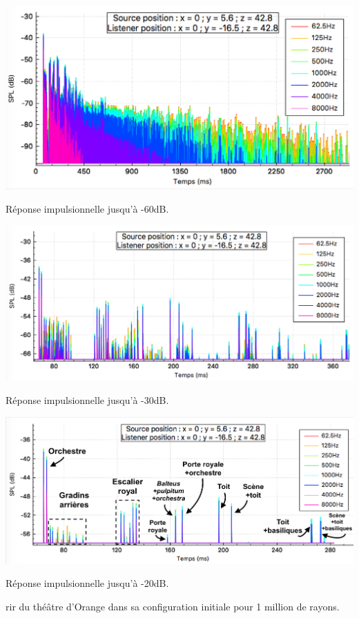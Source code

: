 \begin{figureth}
	\begin{subfigureth}{\linewidth}
		\includegraphics[width=\linewidth]{images/rirTheatreAvecDecor}
			\caption{Réponse impulsionnelle jusqu'à -60dB.}
		\label{rirTheatre60}
	\end{subfigureth}
	\begin{subfigureth}{\linewidth}
		\includegraphics[width=\linewidth]{images/rirTheatre30}
		\caption{Réponse impulsionnelle jusqu'à -30dB.}
		\label{rirTheatre30}
	\end{subfigureth}
		\begin{subfigureth}{\linewidth}
		\includegraphics[width=\linewidth]{images/rirTheatre20}
		\caption{Réponse impulsionnelle jusqu'à -20dB.}
		\label{rirTheatre20}
	\end{subfigureth}
	\caption{\gls{rir} du théâtre d'Orange dans sa configuration initiale pour 1 million de rayons.}
	\label{rirTheatre}
\end{figureth}

